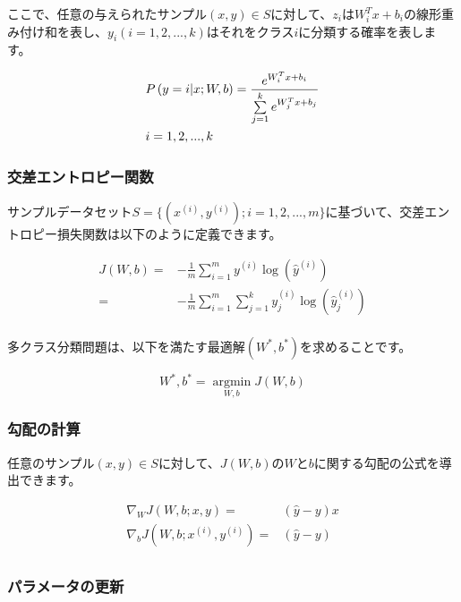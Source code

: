 \begin{content}
ここで、任意の与えられたサンプル$ (x, y) \in S $に対して、$ z_i $は$W_i^Tx+b_i$の線形重み付け和を表し、$y_i(i=1,2,...,k)$はそれをクラス$i$に分類する確率を表します。

\[\begin{gathered}
  P\left( {y = i|x;W,b} \right) = \frac{{{e^{W_i^Tx + b_i}}}}{{\sum\limits_{j = 1}^k {{e^{W_j^Tx + b_j}}} }} \hfill \\
  i = 1,2,...,k \hfill \\ 
\end{gathered} \]

\subsubsection{交差エントロピー関数}

サンプルデータセット$ S = \{ ({x^{(i)}},{y^{(i)}});i = 1,2,...,m\} $に基づいて、交差エントロピー損失関数は以下のように定義できます。

\[\begin{aligned}
  J(W,b) =  &  - \frac{1}{m}\sum\limits_{i = 1}^m {{y^{(i)}}\log \left( {{{\widehat y}^{(i)}}} \right)}  \\ 
   =  &  - \frac{1}{m}\sum\limits_{i = 1}^m {\sum\limits_{j = 1}^k {y_j^{(i)}\log \left( {\widehat y_j^{(i)}} \right)} }  \\
\end{aligned} \]

多クラス分類問題は、以下を満たす最適解$(W^*,b^*)$を求めることです。

\[W^*,b^* = \mathop {\arg \min }\limits_{W,b} J(W,b)\]

\subsubsection{勾配の計算}

任意のサンプル$ (x,y) \in S $に対して、$ J(W,b) $の$ W $と$ b $に関する勾配の公式を導出できます。

\[\begin{aligned}
  {\nabla _W}J\left( {W,b;x,y} \right) =  & \left( {\widehat y - y} \right)x \\ 
  {\nabla _b}J\left( {W,b;{x^{(i)}},{y^{(i)}}} \right) =  & \left( {\widehat y - y} \right) \\ 
\end{aligned} \]

\subsubsection{パラメータの更新}


\end{content}
